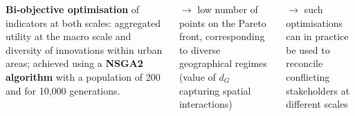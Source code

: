 \documentclass[a0paper]{tikzposter}
\begin{document}
\begin{columns}
{{			    \textbf{Bi-objective optimisation} of indicators at both scales: aggregated utility at the macro scale and diversity of innovations within urban areas; achieved using a \textbf{NSGA2 algorithm} with a population of 200 and for 10,000 generations.

			   
			    \vspace{0.5cm}
			  
			    
			    $\rightarrow$ low number of points on the Pareto front, corresponding to diverse geographical regimes (value of $d_G$ capturing spatial interactions)
			    
			     \vspace{0.5cm}
			    
			     $\rightarrow$ such optimisations can in practice be used to reconcile conflicting stakeholders at different scales
			   
			   \vspace{0.9cm}
			     
		      }
		
		}
		
		
	\end{columns}	
\end{document}
